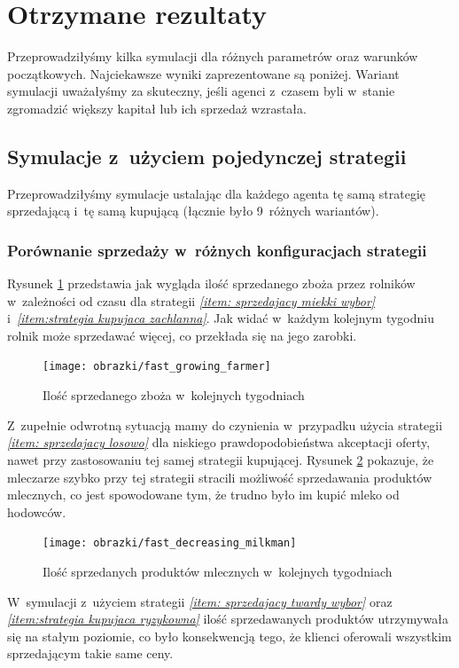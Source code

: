 \documentclass[12pt]{article}
\begin{document}
\section{Otrzymane rezultaty}\label{chapter: rezultaty}
Przeprowadziłyśmy kilka symulacji dla różnych parametrów oraz warunków początkowych. Najciekawsze wyniki zaprezentowane są poniżej. Wariant symulacji uważałyśmy za skuteczny, jeśli agenci z~czasem byli w~stanie zgromadzić
większy kapitał lub ich sprzedaż wzrastała.
\subsection{Symulacje z~użyciem pojedynczej strategii}
Przeprowadziłyśmy symulacje ustalając dla każdego agenta tę samą strategię sprzedającą i~tę samą kupującą (łącznie było 9~różnych wariantów). 

\subsubsection{Porównanie sprzedaży w~różnych konfiguracjach strategii}
Rysunek \ref{fig:growing farmer} przedstawia jak wygląda ilość sprzedanego zboża przez rolników w~zależności od czasu dla strategii \emph{\ref{item: sprzedajacy miekki wybor}} i~\emph{\ref{item:strategia kupujaca zachlanna}}. 
Jak widać w~każdym kolejnym tygodniu rolnik może sprzedawać więcej, co przekłada się na jego zarobki.

\begin{figure} [H]
 \centering
    \texttt{[image: obrazki/fast\_growing\_farmer]}
 \caption{Ilość sprzedanego zboża w~kolejnych tygodniach}
 \label{fig:growing farmer}
\end{figure}

Z~zupełnie odwrotną sytuacją mamy do czynienia w~przypadku użycia strategii \emph{\ref{item: sprzedajacy losowo}} dla niskiego prawdopodobieństwa akceptacji oferty, nawet przy zastosowaniu tej samej strategii kupującej.
Rysunek \ref{fig:dying milkman} pokazuje, że mleczarze szybko przy tej strategii stracili możliwość sprzedawania produktów mlecznych, co jest spowodowane tym, że trudno było im kupić mleko od hodowców.

\begin{figure} [H]
 \centering
    \texttt{[image: obrazki/fast\_decreasing\_milkman]}
 \caption{Ilość sprzedanych produktów mlecznych w~kolejnych tygodniach}
 \label{fig:dying milkman}
\end{figure}

W~symulacji z~użyciem strategii \emph{\ref{item: sprzedajacy twardy wybor}} oraz \emph{\ref{item:strategia kupujaca ryzykowna}} ilość sprzedawanych produktów utrzymywała się na stałym poziomie, co było konsekwencją
tego, że klienci oferowali wszystkim sprzedającym takie same ceny.
\end{document}
